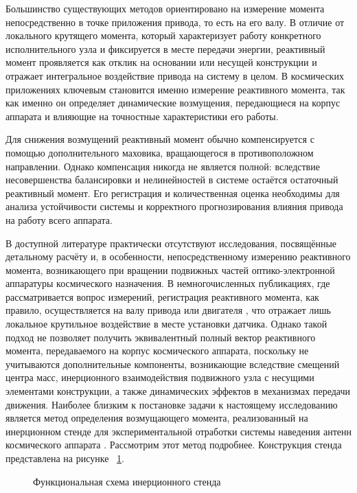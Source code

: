 Большинство существующих методов ориентировано на измерение момента непосредственно в точке приложения привода, то есть на его валу. В отличие от локального крутящего момента, который характеризует работу конкретного исполнительного узла и фиксируется в месте передачи энергии, реактивный момент проявляется как отклик на основании или несущей конструкции и отражает интегральное воздействие привода на систему в целом. В космических приложениях ключевым становится именно измерение реактивного момента, так как именно он определяет динамические возмущения, передающиеся на корпус аппарата и влияющие на точностные характеристики его работы.

Для снижения возмущений реактивный момент обычно компенсируется с помощью дополнительного маховика, вращающегося в противоположном направлении. Однако компенсация никогда не является полной: вследствие несовершенства балансировки и нелинейностей в системе остаётся остаточный реактивный момент. Его регистрация и количественная оценка необходимы для анализа устойчивости системы и корректного прогнозирования влияния привода на работу всего аппарата.

В доступной литературе практически отсутствуют исследования, посвящённые детальному расчёту и, в особенности, непосредственному измерению реактивного момента, возникающего при вращении подвижных частей оптико-электронной аппаратуры космического назначения. В немногочисленных публикациях, где рассматривается вопрос измерений, регистрация реактивного момента, как правило, осуществляется на валу привода или двигателя \cite{}, что отражает лишь локальное крутильное воздействие в месте установки датчика. Однако такой подход не позволяет получить эквивалентный полный вектор реактивного момента, передаваемого на корпус космического аппарата, поскольку не учитываются дополнительные компоненты, возникающие вследствие смещений центра масс, инерционного взаимодействия подвижного узла с несущими элементами конструкции, а также динамических эффектов в механизмах передачи движения. Наиболее близким к постановке задачи к настоящему исследованию является метод определения возмущающего момента, реализованный на инерционном стенде для экспериментальной отработки системы наведения антенн космического аппарата \cite{}. Рассмотрим этот метод подробнее. Конструкция стенда представлена на рисунке ~\cref{fig:stand}.
\begin{figure}[ht] 
	\caption{Функциональная схема инерционного стенда}
	\label{fig:stand} 
\end{figure}

